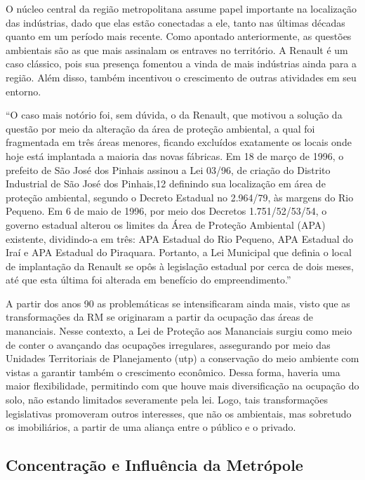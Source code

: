 	O núcleo central da região metropolitana assume papel importante na localização das indústrias, dado que elas estão conectadas a ele, tanto nas últimas décadas quanto em um período mais recente.  Como apontado anteriormente, as questões ambientais são as que mais assinalam os entraves no território. A Renault é um caso clássico, pois sua presença fomentou a vinda de mais indústrias ainda para a região. Além disso, também incentivou o crescimento de outras atividades em seu entorno. 
	
	\begin{citacao}
		``O caso mais notório foi, sem dúvida, o da Renault, que motivou a solução da questão por meio da alteração da área de proteção ambiental, a qual foi fragmentada em três áreas menores, ficando excluídos exatamente os locais onde hoje está implantada a maioria das novas fábricas. Em 18 de março de 1996, o prefeito de São José dos Pinhais assinou a Lei 03/96, de criação do Distrito Industrial de São José dos Pinhais,12 definindo sua localização em área de proteção ambiental, segundo o Decreto Estadual no 2.964/79, às margens do Rio Pequeno. Em 6 de maio de 1996, por meio dos Decretos 1.751/52/53/54, o governo estadual alterou os limites da Área de Proteção Ambiental (APA) existente, dividindo-a em três: APA Estadual do Rio Pequeno, APA Estadual do Iraí e APA Estadual do Piraquara. Portanto, a Lei Municipal que definia o local de implantação da Renault se opôs à legislação estadual por cerca de dois meses, até que esta última foi alterada em benefício do empreendimento.'' \cite[p. 96]{firkowski2002b}
	\end{citacao}

	A partir dos anos 90 as problemáticas se intensificaram ainda mais, visto que as transformações da RM se originaram a partir da ocupação das áreas de mananciais. Nesse contexto, a Lei de Proteção aos Mananciais surgiu como meio de conter o avançando das ocupações irregulares, assegurando por meio das Unidades Territoriais de Planejamento (\gls{utp}) a conservação do meio ambiente com vistas a garantir também o crescimento econômico. Dessa forma, haveria uma maior flexibilidade, permitindo com que houve mais diversificação na ocupação do solo, não estando limitados severamente pela lei. Logo, tais transformações legislativas promoveram outros interesses, que não os ambientais, mas sobretudo os imobiliários, a partir de uma aliança entre o público e o privado.
	
	\subsection{Concentração e Influência da Metrópole}
		
